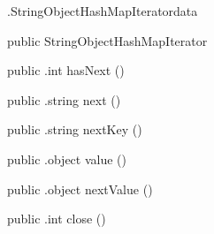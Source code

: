\begin{CrexxClass}{.StringObjectHashMapIterator}{data}

  \begin{Hierarchy}
  \end{Hierarchy}

  \begin{Members}

    \Factory
      {public}
      {StringObjectHashMapIterator}
      {}

    \Method
      {public}
      {.int}
      {hasNext}
      {()}

    \Method
      {public}
      {.string}
      {next}
      {()}

    \Method
      {public}
      {.string}
      {nextKey}
      {()}

    \Method
      {public}
      {.object}
      {value}
      {()}

    \Method
      {public}
      {.object}
      {nextValue}
      {()}

    \Method
      {public}
      {.int}
      {close}
      {()}

  \end{Members}
\end{CrexxClass}

